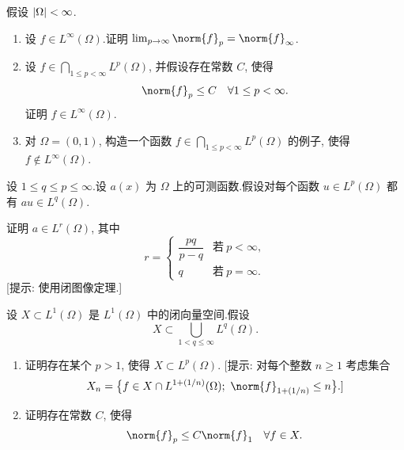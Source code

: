 \begin{exercise}
\label{exer:4.6}
假设 $\left|\Omega\right|<\infty$.
\begin{enumerate}[label=\arabic*., leftmargin=2.2em, itemsep=0.35em]
	\item 设 $f\in L^\infty(\Omega)$.证明 $\lim_{p\to\infty}\norm{f}_p=
	      \norm{f}_\infty$.
	\item 设 $f\in\bigcap_{1\le p<\infty}L^p(\Omega)$, 并假设存在常数 $C$, 使得
	      \begin{equation*}
	      \norm{f}_p\le C\quad\forall1\le p<\infty.
	      \end{equation*}
	      证明 $f\in L^\infty(\Omega)$.
	\item 对 $\Omega=(0,1)$, 构造一个函数 $f\in\bigcap_{1\le p<\infty}L^p(\Omega)$
	      的例子, 使得 $f\notin L^\infty(\Omega)$.
\end{enumerate}
\end{exercise}

\begin{exercise}
\label{exer:4.7}
设 $1\le q\le p\le\infty$.设 $a(x)$ 为 $\Omega$ 上的可测函数.假设对每个函数
$u\in L^p(\Omega)$ 都有 $au\in L^q(\Omega)$.

证明 $a\in L^r(\Omega)$, 其中
\begin{equation*}
r=\begin{cases}
\dfrac{pq}{p-q} & \text{若}\ p<\infty,\\[8pt]
q & \text{若}\ p=\infty.
\end{cases}
\end{equation*}
[提示: 使用闭图像定理.]
\end{exercise}

\begin{exercise}
\label{exer:4.8}
设 $X\subset L^1(\Omega)$ 是 $L^1(\Omega)$ 中的闭向量空间.假设
\begin{equation*}
X\subset\bigcup_{1<q\le\infty}L^q(\Omega).
\end{equation*}
\begin{enumerate}[label=\arabic*., leftmargin=2.2em, itemsep=0.35em]
	\item 证明存在某个 $p>1$, 使得 $X\subset L^p(\Omega)$.
	      [提示: 对每个整数 $n\ge1$ 考虑集合
	      \begin{equation*}
	      X_n=\bigl\{f\in X\cap L^{1+(1/n)}(\Omega);\
	      \norm{f}_{1+(1/n)}\le n\bigr\}.]
	      \end{equation*}
	\item 证明存在常数 $C$, 使得
	      \begin{equation*}
	      \norm{f}_p\le C\norm{f}_1\quad\forall f\in X.
	      \end{equation*}
\end{enumerate}
\end{exercise}

